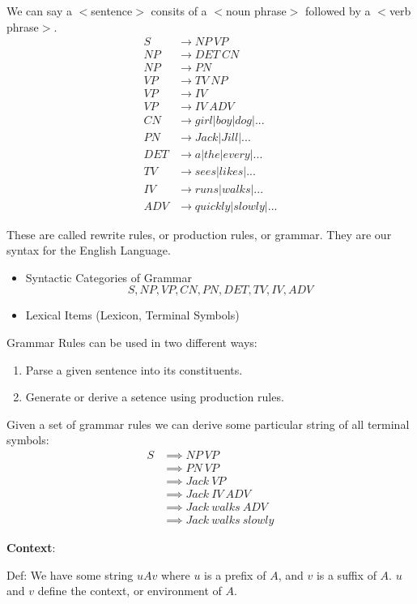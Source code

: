 \documentclass{scrartcl}
\begin{document}
We can say a $<$sentence$>$ consits of a $<$noun phrase$>$ followed by a $<$verb phrase$>$.\\
\begin{align*}
S   &\rightarrow NP\ VP\\
NP  &\rightarrow DET\ CN\\
NP  &\rightarrow PN\\
VP  &\rightarrow TV\ NP\\
VP  &\rightarrow IV\\
VP  &\rightarrow IV\ ADV\\
CN  &\rightarrow girl|boy|dog|...\\
PN  &\rightarrow Jack|Jill|...\\
DET &\rightarrow a|the|every|...\\
TV  &\rightarrow sees|likes|...\\
IV  &\rightarrow runs|walks|...\\
ADV &\rightarrow quickly|slowly|...
\end{align*}

These are called rewrite rules, or production rules, or grammar. They are our syntax for the English Language.
\begin{itemize}
\item Syntactic Categories of Grammar $$S,NP,VP,CN,PN,DET,TV,IV,ADV$$
\item Lexical Items (Lexicon, Terminal Symbols)
\end{itemize}

Grammar Rules can be used in two different ways:
\begin{enumerate}
\item Parse a given sentence into its constituents.
\item Generate or derive a setence using production rules.
\end{enumerate}

Given a set of grammar rules we can derive some particular string of all terminal symbols:
\begin{align*}
S &\implies NP\ VP\\
  &\implies PN\ VP\\
  &\implies Jack\ VP\\
  &\implies Jack\ IV\ ADV\\
  &\implies Jack\ walks\ ADV\\
  &\implies Jack\ walks\ slowly
\end{align*}

\textbf{Context}:

Def: We have some string $uAv$ where $u$ is a prefix of $A$, and $v$ is a suffix of $A$. $u$ and $v$ define the context, or environment of $A$.
\end{document}
